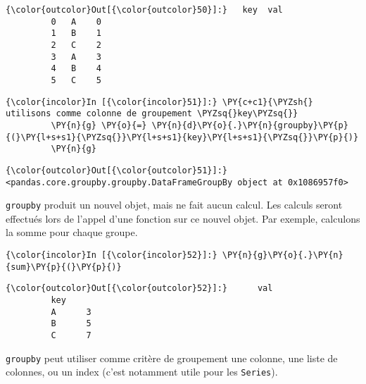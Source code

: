 \begin{Verbatim}[commandchars=\\\{\},frame=single,framerule=0.3mm,rulecolor=\color{cellframecolor}]
{\color{outcolor}Out[{\color{outcolor}50}]:}   key  val
         0   A    0
         1   B    1
         2   C    2
         3   A    3
         4   B    4
         5   C    5
\end{Verbatim}
            
    \begin{Verbatim}[commandchars=\\\{\},frame=single,framerule=0.3mm,rulecolor=\color{cellframecolor}]
{\color{incolor}In [{\color{incolor}51}]:} \PY{c+c1}{\PYZsh{} utilisons comme colonne de groupement \PYZsq{}key\PYZsq{}}
         \PY{n}{g} \PY{o}{=} \PY{n}{d}\PY{o}{.}\PY{n}{groupby}\PY{p}{(}\PY{l+s+s1}{\PYZsq{}}\PY{l+s+s1}{key}\PY{l+s+s1}{\PYZsq{}}\PY{p}{)}
         \PY{n}{g}
\end{Verbatim}


\begin{Verbatim}[commandchars=\\\{\},frame=single,framerule=0.3mm,rulecolor=\color{cellframecolor}]
{\color{outcolor}Out[{\color{outcolor}51}]:} <pandas.core.groupby.groupby.DataFrameGroupBy object at 0x1086957f0>
\end{Verbatim}
            
    \texttt{groupby} produit un nouvel objet, mais ne fait aucun calcul. Les
calculs seront effectués lors de l'appel d'une fonction sur ce nouvel
objet. Par exemple, calculons la somme pour chaque groupe.

    \begin{Verbatim}[commandchars=\\\{\},frame=single,framerule=0.3mm,rulecolor=\color{cellframecolor}]
{\color{incolor}In [{\color{incolor}52}]:} \PY{n}{g}\PY{o}{.}\PY{n}{sum}\PY{p}{(}\PY{p}{)}
\end{Verbatim}


\begin{Verbatim}[commandchars=\\\{\},frame=single,framerule=0.3mm,rulecolor=\color{cellframecolor}]
{\color{outcolor}Out[{\color{outcolor}52}]:}      val
         key     
         A      3
         B      5
         C      7
\end{Verbatim}
            
    \texttt{groupby} peut utiliser comme critère de groupement une colonne,
une liste de colonnes, ou un index (c'est notamment utile pour les
\texttt{Series}).

